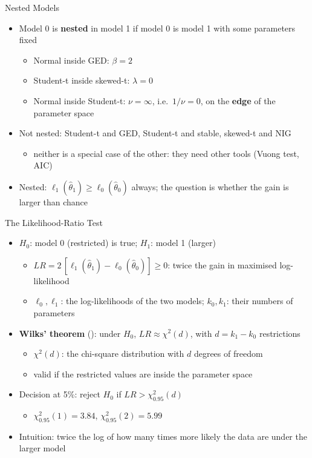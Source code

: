 \begin{frame}{Nested Models}
\itemsize{\small}
\begin{itemize}
    \item Model 0 is \textbf{nested} in model 1 if model 0 is model 1 with some parameters fixed
    \begin{itemize}
        \item Normal inside GED: $\beta = 2$
        \item Student-t inside skewed-t: $\lambda = 0$
        \item Normal inside Student-t: $\nu = \infty$, i.e.\ $1/\nu = 0$, on the \textbf{edge} of the parameter space
    \end{itemize}
    \item Not nested: Student-t and GED, Student-t and stable, skewed-t and NIG
    \begin{itemize}
        \item neither is a special case of the other: they need other tools (Vuong test, AIC)
    \end{itemize}
    \item Nested: $\ell_1(\hat\theta_1) \ge \ell_0(\hat\theta_0)$ always; the question is whether the gain is larger than chance
\end{itemize}
\end{frame}

\begin{frame}{The Likelihood-Ratio Test}
\itemsize{\small}
\begin{itemize}
    \item $H_0$: model 0 (restricted) is true; $H_1$: model 1 (larger)
    \begin{itemize}
        \item $LR = 2\,[\ell_1(\hat\theta_1) - \ell_0(\hat\theta_0)] \ge 0$: twice the gain in maximised log-likelihood
        \item $\ell_0, \ell_1$: the log-likelihoods of the two models; $k_0, k_1$: their numbers of parameters
    \end{itemize}
    \item \textbf{Wilks' theorem} (): under $H_0$, $LR \approx \chi^2(d)$, with $d = k_1 - k_0$ restrictions
    \begin{itemize}
        \item $\chi^2(d)$: the chi-square distribution with $d$ degrees of freedom
        \item valid if the restricted values are inside the parameter space
    \end{itemize}
    \item Decision at 5\%: reject $H_0$ if $LR > \chi^2_{0.95}(d)$
    \begin{itemize}
        \item $\chi^2_{0.95}(1) = 3.84$, $\chi^2_{0.95}(2) = 5.99$
    \end{itemize}
    \item Intuition: twice the log of how many times more likely the data are under the larger model
\end{itemize}
\end{frame}

